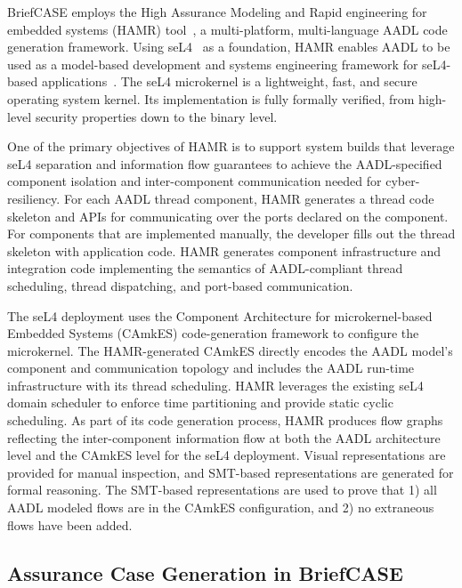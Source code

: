 BriefCASE employs the High Assurance Modeling and Rapid engineering for embedded systems (HAMR) tool~\cite{hamr}, a multi-platform, multi-language AADL code generation framework. 
Using seL4~\cite{sel4-sosp09} as a foundation, HAMR enables AADL to be used as a model-based development and systems engineering framework for seL4-based applications~\cite{hamr-sel4}. 
The seL4 microkernel is a lightweight, fast, and secure operating system kernel. Its implementation is fully formally verified, from high-level security properties down to the binary level.

One of the primary objectives of HAMR is to support system builds that leverage seL4 separation and information flow guarantees to achieve the AADL-specified component isolation and inter-component communication needed for cyber-resiliency. 
%
For each AADL thread component, HAMR generates a thread code skeleton and APIs for communicating over the ports declared on the component. For components that are implemented manually, the developer fills out the thread skeleton with application code. 
HAMR generates component infrastructure and integration code implementing the semantics of AADL-compliant thread scheduling, thread dispatching, and port-based communication. 

The seL4 deployment uses the Component Architecture for microkernel-based Embedded Systems (CAmkES) code-generation framework to configure the microkernel. The HAMR-generated CAmkES directly encodes the AADL model’s component and communication topology and includes the AADL run-time infrastructure with its thread scheduling. HAMR leverages the existing seL4 domain scheduler to enforce time partitioning and provide static cyclic scheduling. 
As part of its code generation process, HAMR produces flow graphs reflecting the inter-component information flow at both the AADL architecture level and the CAmkES level for the seL4 deployment. Visual representations are provided for manual inspection, and SMT-based representations are generated for formal reasoning. The SMT-based representations are used to prove that 1) all AADL modeled flows are in the CAmkES configuration, and 2) no extraneous flows have been added. 


\subsection{Assurance Case Generation in BriefCASE}
\label{sec:resolute}

